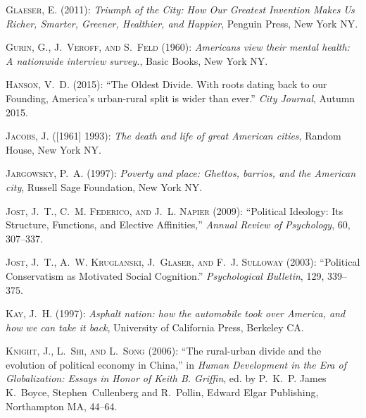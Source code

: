 \documentclass[12pt, letterpaper]{article}
\begin{document}
\begin{spacing}{1.9}
\begin{thebibliography}{77}
\textsc{Glaeser, E.} (2011): \emph{Triumph of the City: How Our Greatest
  Invention Makes Us Richer, Smarter, Greener, Healthier, and Happier}, Penguin
  Press, New York NY.

\textsc{Gurin, G., J.~Veroff, and S.~Feld} (1960): \emph{Americans view their
  mental health: A nationwide interview survey.}, Basic Books, New York NY.

\textsc{Hanson, V.~D.} (2015): \enquote{The Oldest Divide. With roots dating
  back to our Founding, America's urban-rural split is wider than ever.}
  \emph{City Journal}, Autumn 2015.

\textsc{Jacobs, J.} ([1961] 1993): \emph{The death and life of great American
  cities}, Random House, New York NY.

\textsc{Jargowsky, P.~A.} (1997): \emph{Poverty and place: Ghettos, barrios,
  and the American city}, Russell Sage Foundation, New York NY.

\textsc{Jost, J.~T., C.~M. Federico, and J.~L. Napier} (2009):
  \enquote{Political Ideology: Its Structure, Functions, and Elective
  Affinities,} \emph{Annual Review of Psychology}, 60, 307--337.

\textsc{Jost, J.~T., A.~W. Kruglanski, J.~Glaser, and F.~J. Sulloway} (2003):
  \enquote{Political Conservatism as Motivated Social Cognition.}
  \emph{Psychological Bulletin}, 129, 339--375.

\textsc{Kay, J.~H.} (1997): \emph{Asphalt nation: how the automobile took over
  America, and how we can take it back}, University of California Press,
  Berkeley CA.

\textsc{Knight, J., L.~Shi, and L.~Song} (2006): \enquote{The rural-urban
  divide and the evolution of political economy in China,} in \emph{Human
  Development in the Era of Globalization: Essays in Honor of Keith B.
  Griffin}, ed. by P.~K.~P. James K.~Boyce, Stephen~Cullenberg and R.~Pollin,
  Edward Elgar Publishing, Northampton MA, 44--64.


\end{thebibliography}
\end{spacing}
\end{document}
